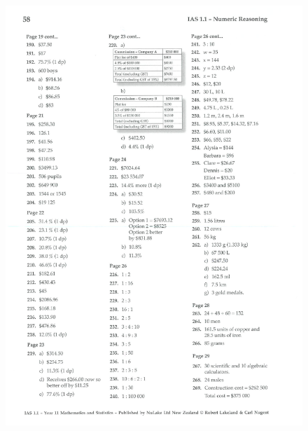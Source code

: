\documentclass[a4paper,12pt]{article}
\begin{document}
\begin{figure}[!h]
	\centering
	\includegraphics[width=17cm]{Nulake_year10_forextension_ratio_sol1}
\end{figure}
\end{document}
